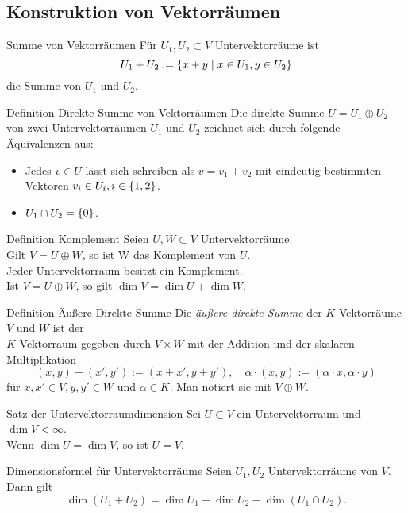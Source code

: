 \documentclass[main.tex]{subfiles}
\begin{document}
\subsection*{Konstruktion von Vektorräumen}
\begin{karte}{Summe von Vektorräumen}
    Für \(U_1, U_2 \subset V\) Untervektorräume ist 
    \[U_1 + U_2 := \{x + y \;\vert \; x \in U_1, y \in U_2\}\]
    die Summe von \(U_1\) und \(U_2\).
\end{karte}
\begin{karte}{Definition Direkte Summe von Vektorräumen}
    Die direkte Summe \(U = U_1 \oplus U_2\) von zwei 
    Untervektorräumen \(U_1\) und \(U_2\) zeichnet sich durch 
    folgende Äquivalenzen aus: 
    \begin{itemize}
        \item Jedes \(v \in U\) lässt sich schreiben als 
        \(v = v_1 + v_2\) mit eindeutig bestimmten Vektoren
        \(v_i \in U_i, i \in \{1,2\}\).
        \item \(U_1 \cap U_2 = \{0\}\).
    \end{itemize}
\end{karte}
\begin{karte}{Definition Komplement}
    Seien \(U,W \subset V\) Untervektorräume.\\
    Gilt \(V = U \oplus W\), so ist W das Komplement von \(U\). \\
    Jeder Untervektorraum besitzt ein Komplement.\\
    Ist \( V = U \oplus W \), so gilt \( \dim V = \dim U + \dim W \).
\end{karte}
\begin{karte}{Definition Äußere Direkte Summe}
    Die \textit{äußere direkte Summe} der \(K\)-Vektorräume \(V\) 
    und \(W\) ist der\\
    \(K\)-Vektorraum gegeben durch \( V \times W \) 
    mit der Addition und der skalaren Multiplikation 
    \[ (x,y) + (x',y') := (x + x', y + y'), \quad 
    \alpha \cdot (x,y) := (\alpha \cdot x, \alpha \cdot y) \]
    für \( x,x' \in V, y,y' \in W \) und \( \alpha \in K \). 
    Man notiert sie mit \( V \oplus W \).
\end{karte}
\begin{karte}{Satz der Untervektorraumdimension}
    Sei \( U \subset V \) ein Untervektorraum und \( \dim V < \infty \). \\
    Wenn \( \dim U = \dim V \), so ist \( U = V \).
\end{karte}
\begin{karte}{Dimensionsformel für Untervektorräume}
    Seien \( U_1, U_2 \) Untervektorräume von \(V\). Dann gilt 
    \[ \dim(U_1 + U_2) = \dim U_1 + \dim U_2 - \dim(U_1 \cap U_2). \]
\end{karte}
\end{document}

